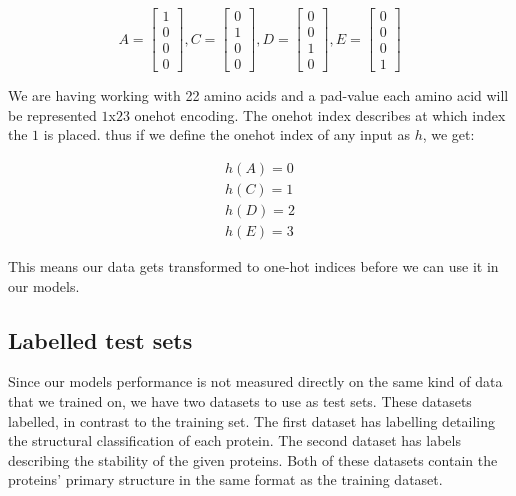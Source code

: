 $$
A = \begin{bmatrix}
1 \\
0 \\
0 \\
0
\end{bmatrix},
C = \begin{bmatrix}
0 \\
1 \\
0 \\
0
\end{bmatrix},
D= \begin{bmatrix}
0 \\
0 \\
1 \\
0
\end{bmatrix},
E= \begin{bmatrix}
0 \\
0 \\
0 \\
1
\end{bmatrix}
$$

\noindent
We are having working with 22 amino acids and a pad-value each amino acid will be represented $1$x$23$ onehot encoding. The onehot index describes at which index the $1$ is placed. thus if we define the onehot index of any input as $h$, we get:

\begin{align}
h(A) = 0 \\
h(C) = 1 \\
h(D) = 2 \\
h(E) = 3
\end{align}

\noindent
This means our data gets transformed to one-hot indices before we can use it in our models.

\subsection{Labelled test sets}
Since our models performance is not measured directly on the same kind of data that we trained on, we have two datasets to use as test sets. These datasets labelled, in contrast to the training set. The first dataset has labelling detailing the structural classification of each protein.\cite{scope} The second dataset has labels describing the stability of the given proteins.\cite{stability} Both of these datasets contain the proteins' primary structure in the same format as the training dataset.\\

\noindent
